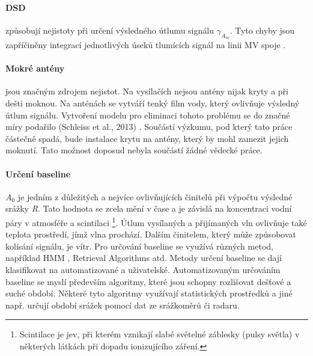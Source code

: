 \documentclass[a4paper,12pt,oneside]{report}
\begin{document}
\paragraph*{DSD} způsobují nejistoty při určení výsledného útlumu
signálu \emph{$\gamma_{A_{m}} $}. Tyto chyby jsou zapříčiněny
integrací jednotlivých úseků tlumících signál na linii MV
spoje \cite{mv1}.

\paragraph*{Mokré antény} jsou značným zdrojem nejistot. Na vysílačích
nejsou antény nijak kryty a při dešti moknou. Na anténách se vytváří
tenký film vody, který ovlivňuje výsledný útlum signálu. Vytvoření
modelu pro eliminaci tohoto problému se do značné míry podařilo
(Schleiss et al., 2013) \cite{wetat}. Součástí výzkumu, pod který tato
práce částečně spadá, bude instalace krytu na antény, který by mohl
zamezit jejich moknutí. Tato možnost doposud nebyla součástí žádné
vědecké práce.

\paragraph*{Určení baseline} \emph{$A_{0}$} je jedním z důležitých
a nejvíce ovlivňujících činitelů při výpočtu výsledné srážky
\emph{R}. Tato hodnota se zcela mění v čase a je závislá na
koncentraci vodní páry v atmosféře a scintilaci \footnote{Scintilace je jev, při kterém vznikají slabé světelné záblesky (pulsy světla) v některých látkách při dopadu ionizujícího záření.}. Útlum vysílaných a
přijímaných vln ovlivňuje také teplota prostředí, jímž vlna
prochází. Dalším činitelem, který může způsobovat kolísání signálu, je
vítr.  Pro určování baseline se využívá různých metod, například
   \acs{HMM} \cite{comparsinmv}, Retrieval Algorithms
\cite{countryw} atd. Metody určení baseline se dají klasifikovat na
automatizované a uživatelské. Automatizovaným určováním baseline se
myslí především algoritmy, které jsou schopny rozlišovat dešťové a suché
období. Některé tyto algoritmy využívají statistických prostředků a
jiné např. určují období srážek pomocí dat ze srážkoměrů
\cite{countryw} či radaru.
\end{document}
